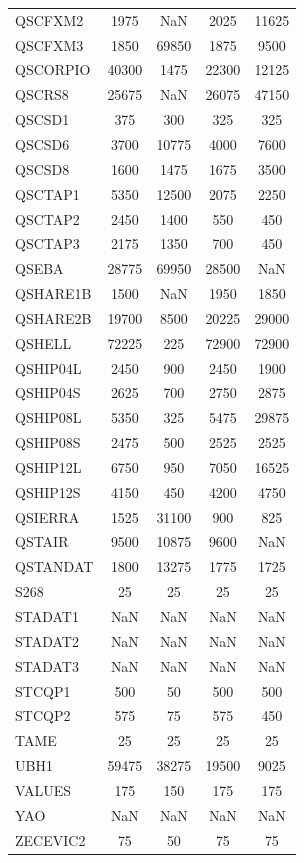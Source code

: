 \begin{longtable}{lcccc}
QSCFXM2  &     1975 &   NaN &     2025 &    11625 \\
QSCFXM3  &     1850 & 69850 &     1875 &     9500 \\
QSCORPIO &    40300 &  1475 &    22300 &    12125 \\
QSCRS8   &    25675 &   NaN &    26075 &    47150 \\
QSCSD1   &      375 &   300 &      325 &      325 \\
QSCSD6   &     3700 & 10775 &     4000 &     7600 \\
QSCSD8   &     1600 &  1475 &     1675 &     3500 \\
QSCTAP1  &     5350 & 12500 &     2075 &     2250 \\
QSCTAP2  &     2450 &  1400 &      550 &      450 \\
QSCTAP3  &     2175 &  1350 &      700 &      450 \\
QSEBA    &    28775 & 69950 &    28500 &      NaN \\
QSHARE1B &     1500 &   NaN &     1950 &     1850 \\
QSHARE2B &    19700 &  8500 &    20225 &    29000 \\
QSHELL   &    72225 &   225 &    72900 &    72900 \\
QSHIP04L &     2450 &   900 &     2450 &     1900 \\
QSHIP04S &     2625 &   700 &     2750 &     2875 \\
QSHIP08L &     5350 &   325 &     5475 &    29875 \\
QSHIP08S &     2475 &   500 &     2525 &     2525 \\
QSHIP12L &     6750 &   950 &     7050 &    16525 \\
QSHIP12S &     4150 &   450 &     4200 &     4750 \\
QSIERRA  &     1525 & 31100 &      900 &      825 \\
QSTAIR   &     9500 & 10875 &     9600 &      NaN \\
QSTANDAT &     1800 & 13275 &     1775 &     1725 \\
S268     &       25 &    25 &       25 &       25 \\
STADAT1  &      NaN &   NaN &      NaN &      NaN \\
STADAT2  &      NaN &   NaN &      NaN &      NaN \\
STADAT3  &      NaN &   NaN &      NaN &      NaN \\
STCQP1   &      500 &    50 &      500 &      500 \\
STCQP2   &      575 &    75 &      575 &      450 \\
TAME     &       25 &    25 &       25 &       25 \\
UBH1     &    59475 & 38275 &    19500 &     9025 \\
VALUES   &      175 &   150 &      175 &      175 \\
YAO      &      NaN &   NaN &      NaN &      NaN \\
ZECEVIC2 &       75 &    50 &       75 &       75 \\
\end{longtable}
